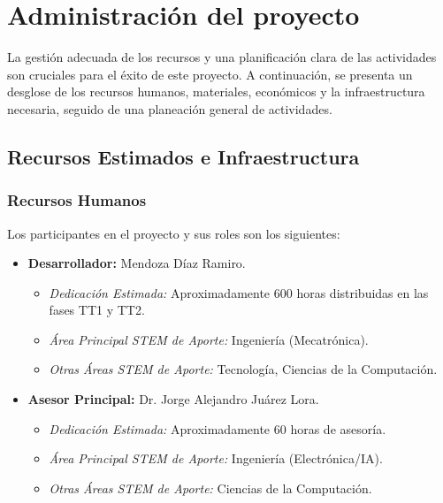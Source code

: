 \documentclass[12pt]{article}
\begin{document}
    
\section{Administración del proyecto}
\label{sec:administracion_proyecto_listas}

La gestión adecuada de los recursos y una planificación clara de las actividades son cruciales para el éxito de este proyecto. A continuación, se presenta un desglose de los recursos humanos, materiales, económicos y la infraestructura necesaria, seguido de una planeación general de actividades.

\subsection{Recursos Estimados e Infraestructura}
\label{ssec:presupuesto_infraestructura_listas}

\subsubsection{Recursos Humanos}
\label{sssec:recursos_humanos_listas}
Los participantes en el proyecto y sus roles son los siguientes:
\begin{itemize}
    \item \textbf{Desarrollador:} Mendoza Díaz Ramiro.
        \begin{itemize}
            \item \textit{Dedicación Estimada:} Aproximadamente 600 horas distribuidas en las fases TT1 y TT2.
            \item \textit{Área Principal STEM de Aporte:} Ingeniería (Mecatrónica).
            \item \textit{Otras Áreas STEM de Aporte:} Tecnología, Ciencias de la Computación.
        \end{itemize}
    \item \textbf{Asesor Principal:} Dr. Jorge Alejandro Juárez Lora.
        \begin{itemize}
            \item \textit{Dedicación Estimada:} Aproximadamente 60 horas de asesoría.
            \item \textit{Área Principal STEM de Aporte:} Ingeniería (Electrónica/IA).
            \item \textit{Otras Áreas STEM de Aporte:} Ciencias de la Computación.
        \end{itemize}
\end{itemize}
\end{document}
